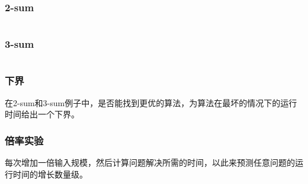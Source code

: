 \documentclass{article}
\begin{document}
  \subsubsection{2-sum}
  \inputminted{java}{src/chapter01/TwoSum.java}

  \subsubsection{3-sum}
  \inputminted{java}{src/chapter01/ThreeSum.java}

  \subsubsection{下界}
  在2-sum和3-sum例子中，是否能找到更优的算法，为算法在最坏的情况下的运行时间给出一个下界。

  \subsubsection{倍率实验}
  每次增加一倍输入规模，然后计算问题解决所需的时间，以此来预测任意问题的运行时间的增长数量级。
\end{document}
